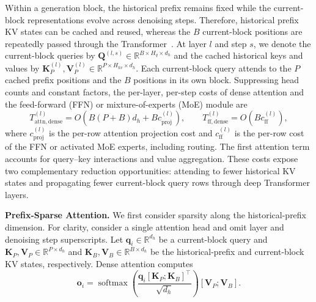 Within a generation block, the historical prefix remains fixed while the current-block representations evolve across denoising steps. Therefore, historical prefix KV states can be cached and reused, whereas the $B$ current-block positions are repeatedly passed through the Transformer~\citep{wu2025fastdllm,wu2025fastdllmv2}. At layer $l$ and step $s$, we denote the current-block queries by
$\mathbf{Q}^{(l,s)}\in\mathbb{R}^{B\times H_q\times d_h}$ and the
cached historical keys and values by
$\mathbf{K}_{P}^{(l)},\mathbf{V}_{P}^{(l)}
\in\mathbb{R}^{P\times H_{kv}\times d_h}$.
Each current-block query attends to the $P$ cached prefix positions and the $B$ positions in its own block. Suppressing head counts and constant factors, the per-layer, per-step costs of dense attention and the feed-forward (FFN) or mixture-of-experts (MoE) module are
\begin{equation}
T_{\mathrm{attn,dense}}^{(l)}
=O\!\left(B(P+B)d_h+B c_{\mathrm{proj}}^{(l)}\right),
\qquad
T_{\mathrm{ff,dense}}^{(l)}
=O\!\left(B c_{\mathrm{ff}}^{(l)}\right),
\label{eq:dense_layer_cost}
\end{equation}
where $c_{\mathrm{proj}}^{(l)}$ is the per-row attention projection cost and $c_{\mathrm{ff}}^{(l)}$ is the per-row cost of the FFN or activated MoE experts, including routing. The first attention term accounts for query--key interactions and value aggregation. These costs expose two complementary reduction opportunities: attending to fewer historical KV states and propagating fewer current-block query rows through deep Transformer layers.


\textbf{Prefix-Sparse Attention.}
\label{sec:preliminaries_prefix_sparse}
We first consider sparsity along the historical-prefix dimension. For
clarity, consider a single attention head and omit layer and denoising
step superscripts. Let $\mathbf{q}_i\in\mathbb{R}^{d_h}$ be a
current-block query and
$\mathbf{K}_{P},\mathbf{V}_{P}\in\mathbb{R}^{P\times d_h}$ and
$\mathbf{K}_{B},\mathbf{V}_{B}\in\mathbb{R}^{B\times d_h}$ be the
historical-prefix and current-block KV states, respectively. Dense attention computes
\begin{equation}
    \mathbf{o}_i
    =
    \operatorname{softmax}
    \left(
        \frac{
            \mathbf{q}_i[\mathbf{K}_{P};\mathbf{K}_{B}]^{\top}
        }{\sqrt{d_h}}
    \right)
    [\mathbf{V}_{P};\mathbf{V}_{B}].
    \label{eq:dense_prefix_attention}
\end{equation}

